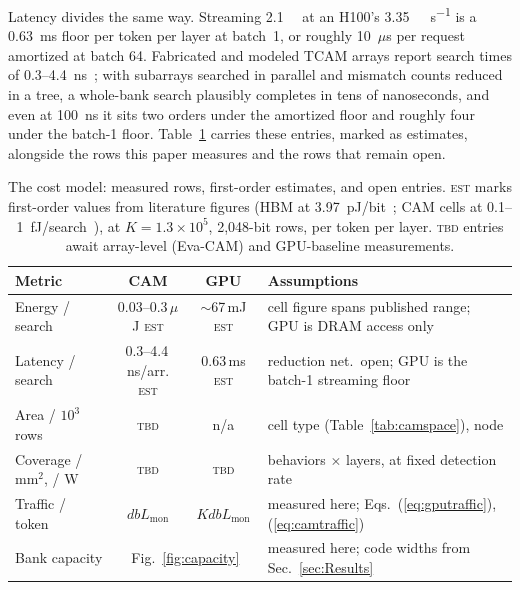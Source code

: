 \documentclass[conference]{IEEEtran}
\newcommand{\cam}{{CAM}\xspace}
\begin{document}
Latency divides the same way. Streaming \qty{2.1}{\giga\byte} at an
H100's \qty{3.35}{\tera\byte\per\second} is a 0.63~ms floor per token
per layer at batch~1, or roughly 10~$\mu$s per request amortized at
batch 64. Fabricated and modeled TCAM arrays report search times of
0.3--4.4~ns~\cite{liu2022evacam,ni2019fetcam}; with subarrays searched
in parallel and mismatch counts reduced in a tree, a whole-bank search
plausibly completes in tens of nanoseconds, and even at 100~ns it sits
two orders under the amortized floor and roughly four under the
batch-1 floor. Table~\ref{tab:costmodel} carries these entries, marked
as estimates, alongside the rows this paper measures and the rows that
remain open.

\begin{table}[t]
\centering
\caption{The cost model: measured rows, first-order estimates, and open
entries. \textsc{est} marks first-order values from literature figures
(HBM at 3.97~pJ/bit~\cite{oconnor2017fgdram}; \cam cells at
0.1--1~fJ/search~\cite{pagiamtzis2006cam,ni2019fetcam,liu2022evacam}),
at $K=1.3\!\times\!10^{5}$, 2{,}048-bit rows, per token per layer.
\textsc{tbd} entries await array-level (Eva-CAM) and GPU-baseline
measurements.}
\label{tab:costmodel}
{\scriptsize\setlength{\tabcolsep}{3pt}
\begin{tabular}{@{}lccp{}@{}}
\toprule
\textbf{Metric} & \textbf{CAM} & \textbf{GPU} & \textbf{Assumptions} \\
\midrule
Energy / search & \makecell[l]{0.03--0.3\,$\mu$J\\\textsc{est}} &
  \makecell[l]{$\sim$67\,mJ\\\textsc{est}} &
  cell figure spans published range; GPU is DRAM access only \\
Latency / search & \makecell[l]{0.3--4.4\,ns/arr.\\\textsc{est}} &
  \makecell[l]{0.63\,ms\\\textsc{est}} &
  reduction net.\ open; GPU is the batch-1 streaming floor \\
Area / $10^{3}$ rows & \textsc{tbd} & n/a &
  cell type (Table~\ref{tab:camspace}), node \\
Coverage / mm$^{2}$, / W & \textsc{tbd} & \textsc{tbd} &
  behaviors $\times$ layers, at fixed detection rate \\
Traffic / token & $d b L_{\mathrm{mon}}$ & $K d b L_{\mathrm{mon}}$ &
  measured here; Eqs.~(\ref{eq:gputraffic}), (\ref{eq:camtraffic}) \\
Bank capacity & \multicolumn{2}{c}{Fig.~\ref{fig:capacity}} &
  measured here; code widths from Sec.~\ref{sec:Results} \\
\bottomrule
\end{tabular}}
\end{table}
\end{document}
